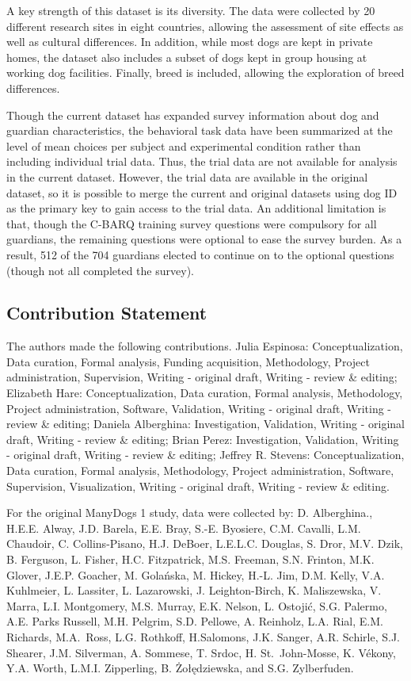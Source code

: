 \documentclass[
  pub,floatsintext]{apa6}
\begin{document}
A key strength of this dataset is its diversity. The data were collected by 20 different research sites in eight countries, allowing the assessment of site effects as well as cultural differences. In addition, while most dogs are kept in private homes, the dataset also includes a subset of dogs kept in group housing at working dog facilities. Finally, breed is included, allowing the exploration of breed differences.

Though the current dataset has expanded survey information about dog and guardian characteristics, the behavioral task data have been summarized at the level of mean choices per subject and experimental condition rather than including individual trial data. Thus, the trial data are not available for analysis in the current dataset. However, the trial data are available in the original dataset, so it is possible to merge the current and original datasets using dog ID as the primary key to gain access to the trial data. An additional limitation is that, though the C-BARQ training survey questions were compulsory for all guardians, the remaining questions were optional to ease the survey burden. As a result, 512 of the 704 guardians elected to continue on to the optional questions (though not all completed the survey).

\hypertarget{contribution-statement}{%
\subsection{Contribution Statement}\label{contribution-statement}}

The authors made the following contributions. Julia Espinosa: Conceptualization, Data curation, Formal analysis, Funding acquisition, Methodology, Project administration, Supervision, Writing - original draft, Writing - review \& editing; Elizabeth Hare: Conceptualization, Data curation, Formal analysis, Methodology, Project administration, Software, Validation, Writing - original draft, Writing - review \& editing; Daniela Alberghina: Investigation, Validation, Writing - original draft, Writing - review \& editing; Brian Perez: Investigation, Validation, Writing - original draft, Writing - review \& editing; Jeffrey R. Stevens: Conceptualization, Data curation, Formal analysis, Methodology, Project administration, Software, Supervision, Visualization, Writing - original draft, Writing - review \& editing.

For the original ManyDogs 1 study, data were collected by: D. Alberghina., H.E.E. Alway, J.D. Barela, E.E. Bray, S.-E. Byosiere, C.M. Cavalli, L.M. Chaudoir, C. Collins-Pisano, H.J. DeBoer, L.E.L.C. Douglas, S. Dror, M.V. Dzik, B. Ferguson, L. Fisher, H.C. Fitzpatrick, M.S. Freeman, S.N. Frinton, M.K. Glover, J.E.P. Goacher, M. Golańska, M.
Hickey, H.-L. Jim, D.M. Kelly, V.A. Kuhlmeier, L. Lassiter, L. Lazarowski, J. Leighton-Birch, K. Maliszewska, V. Marra, L.I. Montgomery, M.S. Murray, E.K. Nelson, L. Ostojić, S.G. Palermo, A.E. Parks Russell, M.H. Pelgrim, S.D. Pellowe, A. Reinholz, L.A. Rial, E.M. Richards, M.A.~Ross, L.G. Rothkoff, H.Salomons, J.K. Sanger, A.R. Schirle, S.J. Shearer, J.M. Silverman, A. Sommese, T. Srdoc, H. St.~John-Mosse, K. Vékony, Y.A. Worth, L.M.I. Zipperling, B. Żołędziewska, and S.G. Zylberfuden.
\end{document}
